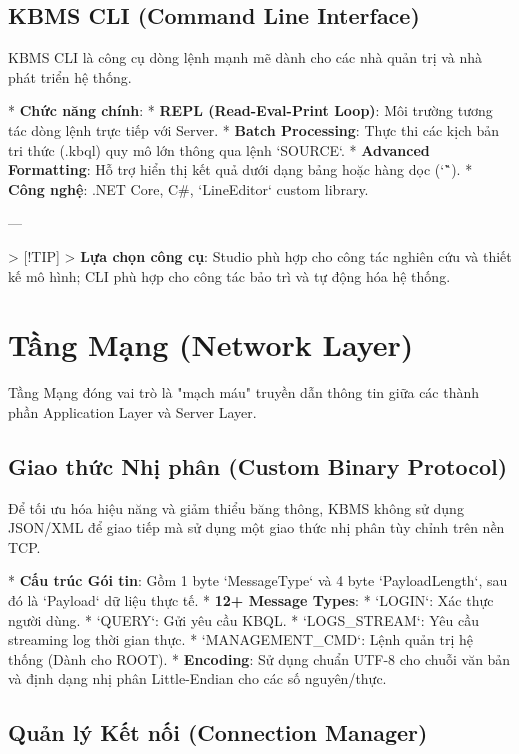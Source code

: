 \subsection{KBMS CLI (Command Line Interface)}

KBMS CLI là công cụ dòng lệnh mạnh mẽ dành cho các nhà quản trị và nhà phát triển hệ thống.

*   \textbf{Chức năng chính}:
    *   \textbf{REPL (Read-Eval-Print Loop)}: Môi trường tương tác dòng lệnh trực tiếp với Server.
    *   \textbf{Batch Processing}: Thực thi các kịch bản tri thức (.kbql) quy mô lớn thông qua lệnh `SOURCE`.
    *   \textbf{Advanced Formatting}: Hỗ trợ hiển thị kết quả dưới dạng bảng hoặc hàng dọc (`\G`).
*   \textbf{Công nghệ}: .NET Core, C\#, `LineEditor` custom library.

---

> [!TIP]
> \textbf{Lựa chọn công cụ}: Studio phù hợp cho công tác nghiên cứu và thiết kế mô hình; CLI phù hợp cho công tác bảo trì và tự động hóa hệ thống.

\section{Tầng Mạng (Network Layer)}

Tầng Mạng đóng vai trò là "mạch máu" truyền dẫn thông tin giữa các thành phần Application Layer và Server Layer.

\subsection{Giao thức Nhị phân (Custom Binary Protocol)}

Để tối ưu hóa hiệu năng và giảm thiểu băng thông, KBMS không sử dụng JSON/XML để giao tiếp mà sử dụng một giao thức nhị phân tùy chỉnh trên nền TCP.

*   \textbf{Cấu trúc Gói tin}: Gồm 1 byte `MessageType` và 4 byte `PayloadLength`, sau đó là `Payload` dữ liệu thực tế.
*   \textbf{12+ Message Types}: 
    *   `LOGIN`: Xác thực người dùng.
    *   `QUERY`: Gửi yêu cầu KBQL.
    *   `LOGS\_STREAM`: Yêu cầu streaming log thời gian thực.
    *   `MANAGEMENT\_CMD`: Lệnh quản trị hệ thống (Dành cho ROOT).
*   \textbf{Encoding}: Sử dụng chuẩn UTF-8 cho chuỗi văn bản và định dạng nhị phân Little-Endian cho các số nguyên/thực.

\subsection{Quản lý Kết nối (Connection Manager)}

